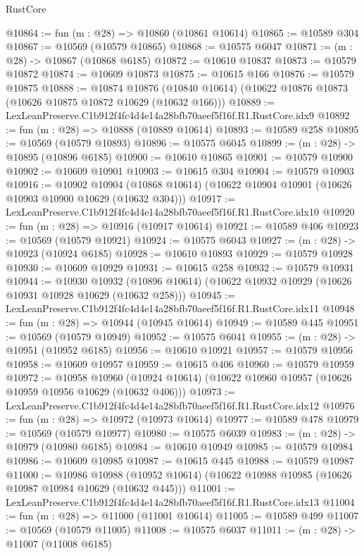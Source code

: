 \begin{lexlean}{RustCore}
\begin{coremodule}
@10864 := fun (m : @28) => @10860 (@10861 @10614)
@10865 := @10589 @304
@10867 := @10569 (@10579 @10865)
@10868 := @10575 @6047
@10871 := (m : @28) -> @10867 (@10868 @6185)
@10872 := @10610 @10837
@10873 := @10579 @10872
@10874 := @10609 @10873
@10875 := @10615 @166
@10876 := @10579 @10875
@10888 := @10874
    @10876
    (@10840 @10614)
    (@10622 @10876 @10873 (@10626 @10875 @10872 @10629 (@10632 @166)))
@10889 := LexLeanPreserve.C1b912f4fc4d4e14a28bfb70aeef5f16f.R1.RustCore.idx9
@10892 := fun (m : @28) => @10888 (@10889 @10614)
@10893 := @10589 @258
@10895 := @10569 (@10579 @10893)
@10896 := @10575 @6045
@10899 := (m : @28) -> @10895 (@10896 @6185)
@10900 := @10610 @10865
@10901 := @10579 @10900
@10902 := @10609 @10901
@10903 := @10615 @304
@10904 := @10579 @10903
@10916 := @10902
    @10904
    (@10868 @10614)
    (@10622 @10904 @10901 (@10626 @10903 @10900 @10629 (@10632 @304)))
@10917 := LexLeanPreserve.C1b912f4fc4d4e14a28bfb70aeef5f16f.R1.RustCore.idx10
@10920 := fun (m : @28) => @10916 (@10917 @10614)
@10921 := @10589 @406
@10923 := @10569 (@10579 @10921)
@10924 := @10575 @6043
@10927 := (m : @28) -> @10923 (@10924 @6185)
@10928 := @10610 @10893
@10929 := @10579 @10928
@10930 := @10609 @10929
@10931 := @10615 @258
@10932 := @10579 @10931
@10944 := @10930
    @10932
    (@10896 @10614)
    (@10622 @10932 @10929 (@10626 @10931 @10928 @10629 (@10632 @258)))
@10945 := LexLeanPreserve.C1b912f4fc4d4e14a28bfb70aeef5f16f.R1.RustCore.idx11
@10948 := fun (m : @28) => @10944 (@10945 @10614)
@10949 := @10589 @445
@10951 := @10569 (@10579 @10949)
@10952 := @10575 @6041
@10955 := (m : @28) -> @10951 (@10952 @6185)
@10956 := @10610 @10921
@10957 := @10579 @10956
@10958 := @10609 @10957
@10959 := @10615 @406
@10960 := @10579 @10959
@10972 := @10958
    @10960
    (@10924 @10614)
    (@10622 @10960 @10957 (@10626 @10959 @10956 @10629 (@10632 @406)))
@10973 := LexLeanPreserve.C1b912f4fc4d4e14a28bfb70aeef5f16f.R1.RustCore.idx12
@10976 := fun (m : @28) => @10972 (@10973 @10614)
@10977 := @10589 @478
@10979 := @10569 (@10579 @10977)
@10980 := @10575 @6039
@10983 := (m : @28) -> @10979 (@10980 @6185)
@10984 := @10610 @10949
@10985 := @10579 @10984
@10986 := @10609 @10985
@10987 := @10615 @445
@10988 := @10579 @10987
@11000 := @10986
    @10988
    (@10952 @10614)
    (@10622 @10988 @10985 (@10626 @10987 @10984 @10629 (@10632 @445)))
@11001 := LexLeanPreserve.C1b912f4fc4d4e14a28bfb70aeef5f16f.R1.RustCore.idx13
@11004 := fun (m : @28) => @11000 (@11001 @10614)
@11005 := @10589 @499
@11007 := @10569 (@10579 @11005)
@11008 := @10575 @6037
@11011 := (m : @28) -> @11007 (@11008 @6185)

\end{coremodule}
\end{lexlean}
